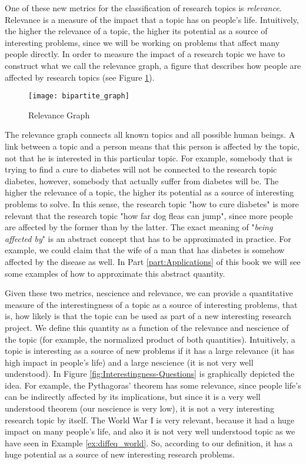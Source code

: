 One of these new metrics for the classification of research topics is \emph{relevance}. Relevance is a measure of the impact that a topic has on people's life. Intuitively, the higher the relevance of a topic, the higher its potential as a source of interesting problems, since we will be working on problems that affect many people directly. In order to measure the impact of a research topic we have to construct what we call the relevance graph, a figure that describes how people are affected by research topics (see Figure \ref{fig:Relevance-Graph_Intro}).

\begin{figure}[h]
\centering\texttt{[image: bipartite\_graph]}
\caption{\label{fig:Relevance-Graph_Intro}Relevance Graph}
\end{figure}

The relevance graph connects all known topics and all possible human beings. A link between a topic and a person means that this person is affected by the topic, not that he is interested in this particular topic. For example, somebody that is trying to find a cure to diabetes will not be connected to the research topic diabetes, however, somebody that actually suffer from diabetes will be. The higher the relevance of a topic, the higher its potential as a source of interesting problems to solve. In this sense, the research topic "how to cure diabetes" is more relevant that the research topic "how far dog fleas can jump", since more people are affected by the former than by the latter. The exact meaning of "\emph{being affected by}" is an abstract concept that has to be approximated in practice. For example, we could claim that the wife of a man that has diabetes is somehow affected by the disease as well. In Part \ref{part:Applications} of this book we will see some examples of how to approximate this abstract quantity.

Given these two metrics, nescience and relevance, we can provide a quantitative measure of the interestingness of a topic as a source of interesting problems, that is, how likely is that the topic can be used as part of a new interesting research project. We define this quantity as a function of the relevance and nescience of the topic (for example, the normalized product of both quantities). Intuitively, a topic is interesting as a source of new problems if it has a large relevance (it has high impact in people's life) and a large nescience (it is not very well understood). In Figure \ref{fig:Interestingness-Questions} is graphically depicted the idea. For example, the Pythagoras' theorem has some relevance, since people life's can be indirectly affected by its implications, but since it is a very well understood theorem (our nescience is very low), it is not a very interesting research topic by itself. The World War I is very relevant, because it had a huge impact on many people's life, and also it is not very well understood topic as we have seen in Example \ref{ex:diffeq_world}. So, according to our definition, it has a huge potential as a source of new interesting research problems.

